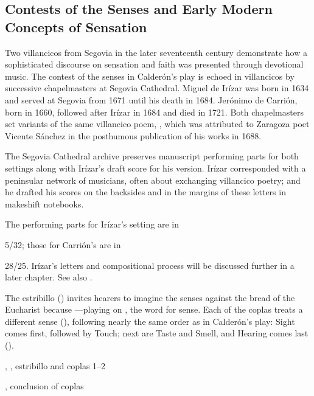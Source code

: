 \subsection{Contests of the Senses and Early Modern Concepts of Sensation}

Two villancicos from Segovia in the later seventeenth century demonstrate how a 
sophisticated discourse on sensation and faith was presented through devotional 
music.
The contest of the senses in Calderón's play is echoed in villancicos by 
successive chapelmasters at Segovia Cathedral.
Miguel de Irízar was born in 1634 and served at Segovia from 1671 until his 
death in 1684.
Jerónimo de Carrión, born in 1660, followed after Irízar in 1684 and died in 
1721.%
    \Autocite{LopezCalo:Segovia}
Both chapelmasters set variants of the same villancico poem, , which was attributed to Zaragoza poet 
Vicente Sánchez in the posthumous publication of his works in 1688.

The Segovia Cathedral archive preserves manuscript performing parts for both 
settings along with Irízar's draft score for his version.
Irízar corresponded with a peninsular network of musicians, often about 
exchanging villancico poetry; and he drafted his scores on the backsides and in 
the margins of these letters in makeshift notebooks.
\begin{Footnote}
    The performing parts for Irízar's setting are in \signature{E-SE}{5/32}; 
    those for Carrión's are in \signature{E-SE}{28/25}.
    Irízar's letters and compositional process will be discussed further in 
    a later chapter. %
    See also 
    \Autocites{LopezCalo:IrizarLetters1}{Olarte:Irizar}{Rodriguez:Networks}.
\end{Footnote}

The estribillo () invites 
hearers to imagine the senses  against the bread of 
the Eucharist because ---playing on , the word for sense.
Each of the coplas treats a different sense 
(), following nearly the same 
order as in Calderón's play: 
Sight comes first, followed by Touch; next are Taste and Smell, and Hearing 
comes last ().

\begin{expoem}
    \caption{, 
    , estribillo and coplas 1--2}
    \label{expoem:Si_los_sentidos-Sanchez-estribillo}
\end{expoem}
\begin{expoem}
    \caption{, 
    conclusion of coplas}
    \label{expoem:Si_los_sentidos-Sanchez-coplas}
\end{expoem}


